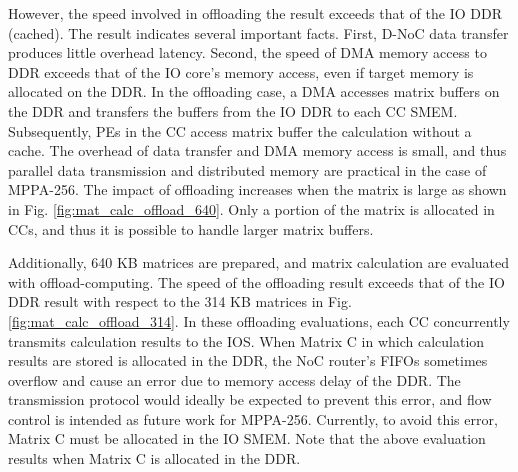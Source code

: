 However, the speed involved in offloading the result exceeds that of the IO DDR (cached).
The result indicates several important facts.
First, D-NoC data transfer produces little overhead latency.
Second, the speed of DMA memory access to DDR exceeds that of the IO core's memory access, even if target memory is allocated on the DDR.
In the offloading case, a DMA accesses matrix buffers on the DDR and transfers the buffers from the IO DDR to each CC SMEM.
Subsequently, PEs in the CC access matrix buffer the calculation without a cache.
The overhead of data transfer and DMA memory access is small, and thus parallel data transmission and distributed memory are practical in the case of MPPA-256.
The impact of offloading increases when the matrix is large as shown in Fig. \ref{fig:mat_calc_offload_640}.
Only a portion of the matrix is allocated in CCs, and thus it is possible to handle larger matrix buffers.

Additionally, 640 KB matrices are prepared, and matrix calculation are evaluated with offload-computing.
The speed of the offloading result exceeds that of the IO DDR result with respect to the 314 KB matrices in Fig. \ref{fig:mat_calc_offload_314}.
In these offloading evaluations, each CC concurrently transmits calculation results to the IOS.
When Matrix C in which calculation results are stored is allocated in the DDR, the NoC router's FIFOs sometimes overflow and cause an error due to memory access delay of the DDR.
The transmission protocol would ideally be expected to prevent this error, and flow control is intended as future work for MPPA-256.
Currently, to avoid this error, Matrix C must be allocated in the IO SMEM.
Note that the above evaluation results when Matrix C is allocated in the DDR.


